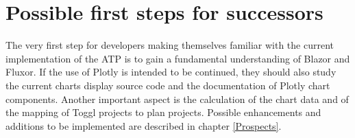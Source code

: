 \section{Possible first steps for successors}
The very first step for developers making themselves familiar with the current implementation of the ATP is to gain a fundamental understanding of Blazor and Fluxor. If the use of Plotly is intended to be continued, they should also study the current charts display source code and the documentation of Plotly chart components. Another important aspect is the calculation of the chart data and of the mapping of Toggl projects to plan projects. Possible enhancements and additions to be implemented are described in chapter \ref{Prospects}.